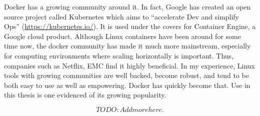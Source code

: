 Docker has a growing community around it. In fact, Google has created an open source project called Kubernetes which aims to ``accelerate Dev and simplify Ops'' (\url{https://kubernetes.io/}). It is used under the covers for Container Engine, a Google cloud product. Although Linux containers have been around for some time now, the docker community has made it much more mainstream, especially for computing environments where scaling horizontally is important. Thus, companies such as Netflix, EMC find it highly beneficial. In my experience, Linux tools with growing communities are well backed, become robust, and tend to be both easy to use as well as empowering.
Docker has quickly become that. Use in this thesis is one evidenced of its growing popularity. %

\[TODO: Add more here.\]
